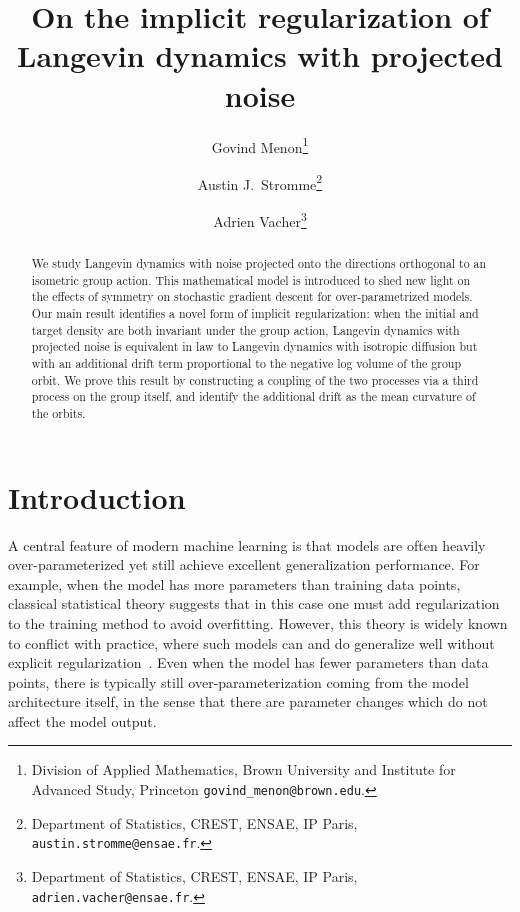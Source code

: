 \documentclass[twoside,a4paper,11pt]{article}
\theoremstyle{plain}
\begin{document}
\title{On the implicit regularization of Langevin dynamics with projected noise}
\author{
Govind Menon\thanks{Division of Applied Mathematics, Brown University and Institute for Advanced Study, Princeton
\texttt{govind\_menon@brown.edu}.}
\and
Austin J.\ Stromme\thanks{Department of Statistics, CREST, ENSAE, IP Paris, \texttt{austin.stromme@ensae.fr}.}
\and
Adrien Vacher\thanks{Department of Statistics, CREST, ENSAE, IP Paris, \texttt{adrien.vacher@ensae.fr}.}
}

\maketitle



\begin{abstract}
  We study Langevin dynamics with noise projected
    onto the directions orthogonal to an isometric group action. 
    This mathematical model is introduced to shed new light on 
    the effects of symmetry on stochastic gradient descent for over-parametrized models.
    Our main result
    identifies a novel form of implicit regularization:
    when the initial and target density are both invariant
    under the group action,
    Langevin dynamics with projected noise
    is equivalent in law
    to Langevin dynamics with isotropic diffusion but with an additional
    drift term proportional to the negative log volume
    of the group orbit.
    We prove this result
    by constructing a coupling
    of the two processes via
    a third process on the group itself,
    and identify
    the additional drift as the mean curvature of the orbits.
\end{abstract}

\section{Introduction}

A central feature of
modern machine learning is that models are often
heavily over-parameterized yet still
achieve excellent generalization performance.
For example, when the model has more parameters
than training data points,
classical statistical 
theory suggests that in this case one must add regularization to the training method to avoid overfitting.
However, this theory is widely known to conflict with practice, where
such models can and do generalize well without explicit
regularization~\cite{zhang2021understanding}.
Even when the model has fewer parameters than data points,
there is typically still over-parameterization coming from
the model architecture itself, in the sense
that there are parameter changes which do not affect the model output.
\end{document}
